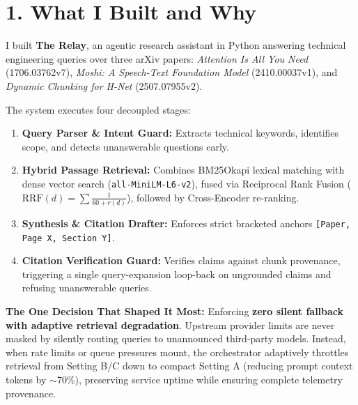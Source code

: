 \documentclass[9pt,twocolumn]{article}
\begin{document}

\section{1. What I Built and Why}
I built \textbf{The Relay}, an agentic research assistant in Python answering technical engineering queries over three arXiv papers: \textit{Attention Is All You Need} (1706.03762v7), \textit{Moshi: A Speech-Text Foundation Model} (2410.00037v1), and \textit{Dynamic Chunking for H-Net} (2507.07955v2).

The system executes four decoupled stages:
\begin{enumerate}
    \setlength{\itemsep}{0pt}\setlength{\parskip}{0pt}
    \item \textbf{Query Parser \& Intent Guard:} Extracts technical keywords, identifies scope, and detects unanswerable questions early.
    \item \textbf{Hybrid Passage Retrieval:} Combines BM25Okapi lexical matching with dense vector search (\texttt{all-MiniLM-L6-v2}), fused via Reciprocal Rank Fusion ($\mathrm{RRF}(d) = \sum \frac{1}{60 + r(d)}$), followed by Cross-Encoder re-ranking.
    \item \textbf{Synthesis \& Citation Drafter:} Enforces strict bracketed anchors \texttt{[Paper, Page X, Section Y]}.
    \item \textbf{Citation Verification Guard:} Verifies claims against chunk provenance, triggering a single query-expansion loop-back on ungrounded claims and refusing unanswerable queries.
\end{enumerate}

\textbf{The One Decision That Shaped It Most:} 
Enforcing \textbf{zero silent fallback with adaptive retrieval degradation}. Upstream provider limits are never masked by silently routing queries to unannounced third-party models. Instead, when rate limits or queue pressures mount, the orchestrator adaptively throttles retrieval from Setting B/C down to compact Setting A (reducing prompt context tokens by $\sim$70\%), preserving service uptime while ensuring complete telemetry provenance.
\end{document}
